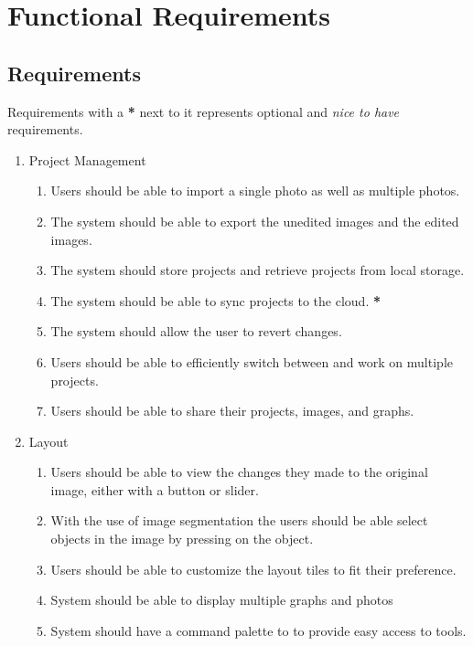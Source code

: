 \documentclass[11pt,a4paper]{article}
\begin{document}
\section*{Functional Requirements}

\subsection*{Requirements}

Requirements with a \textbf{*} next to it represents optional and \textit{nice
to have} requirements.

\begin{enumerate}[label=\arabic*.]
    \item Project Management
    \begin{enumerate}[label*=\arabic*.]
        \item Users should be able to import a single photo as well as multiple photos. 
        \item The system should be able to export the unedited images and the edited images.
        \item The system should store projects and retrieve projects from local storage.
        \item The system should be able to sync projects to the cloud. \textbf{*}
        \item The system should allow the user to revert changes.
        \item Users should be able to efficiently switch between and work on multiple projects.
        \item Users should be able to share their projects, images, and graphs.
    \end{enumerate}
    
    \item Layout
    \begin{enumerate}[label*=\arabic*.]
        \item Users should be able to view the changes they made to the original image,
        either with a button or slider.
        \item With the use of image segmentation the users should be able select
        objects in the image by pressing on the object.
        \item Users should be able to customize the layout tiles to fit their preference.
        \item System should be able to display multiple graphs and photos
        \item System should have a command palette to to provide easy access to tools.
    \end{enumerate}


\end{enumerate}
\end{document}
